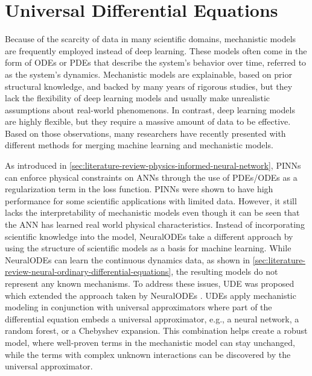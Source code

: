 \section{Universal Differential Equations}

Because of the scarcity of data in many scientific domains, mechanistic models are frequently employed instead of deep learning.
These models often come in the form of \glspl{ODE} or \glspl{PDE} that describe the system's behavior over time, referred to as the system's dynamics.
Mechanistic models are explainable, based on prior structural knowledge, and backed by many years of rigorous studies, but they lack the flexibility of deep learning models and usually make unrealistic assumptions about real-world phenomenons.
In contrast, deep learning models are highly flexible, but they require a massive amount of data to be effective.
Based on those observations, many researchers have recently presented with different methods for merging machine learning and mechanistic models.

As introduced in \autoref{sec:literature-review-physics-informed-neural-network}, \glspl{PINN} can enforce physical constraints on \glspl{ANN} through the use of \glspl{PDE}/\glspl{ODE} as a regularization term in the loss function.
\glspl{PINN} were shown to have high performance for some scientific applications with limited data.
However, it still lacks the interpretability of  mechanistic models even though it can be seen that the \gls{ANN} has learned real world physical characteristics.
Instead of incorporating scientific knowledge into the model, \glspl{NeuralODE} take a different approach by using the structure of scientific models as a basis for machine learning.
While \glspl{NeuralODE} can learn the continuous dynamics data, as shown in \autoref{sec:literature-review-neural-ordinary-differential-equations}, the resulting models do not represent any known mechanisms.
To address these issues, \gls{UDE} was proposed which extended the approach taken by \glspl{NeuralODE} \cite{rackauckasUniversalDifferentialEquations2020}.
\glspl{UDE} apply mechanistic modeling in conjunction with universal approximators where part of the differential equation embeds a universal approximator, e.g., a neural network, a random forest, or a Chebyshev expansion.
This combination helps create a robust model, where well-proven terms in the mechanistic model can stay unchanged, while the terms with complex unknown interactions can be discovered by the universal approximator.

